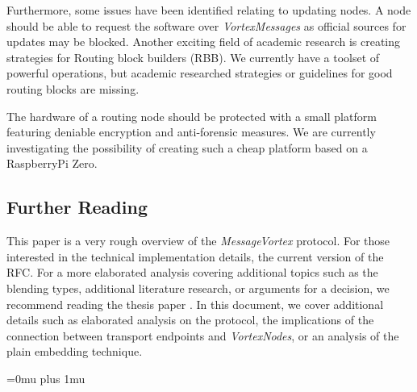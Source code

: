 \documentclass[acmsmall, screen, review]{acmart}
\begin{document}
Furthermore, some issues have been identified relating to updating nodes. A node should be able to request the software over \emph{VortexMessages} as official sources for updates may be blocked. Another exciting field of academic research is creating strategies for Routing block builders (RBB). We currently have a toolset of powerful operations, but academic researched strategies or guidelines for good routing blocks are missing. 

The hardware of a routing node should be protected with a small platform featuring deniable encryption and anti-forensic measures. We are currently investigating the possibility of creating such a cheap platform based on a RaspberryPi Zero. 

\subsection{Further Reading}
This paper is a very rough overview of the \emph{MessageVortex} protocol. For those interested in the technical implementation details, the current version of the RFC\cite{MessageVortexRFC}. For a more elaborated analysis covering additional topics such as the blending types, additional literature research, or arguments for a decision, we recommend reading the thesis paper \cite{messageVortex}. In this document, we cover additional details such as elaborated analysis on the protocol, the implications of the connection between transport endpoints and \emph{VortexNodes}, or an analysis of the plain embedding technique.



\Urlmuskip=0mu plus 1mu %

\end{document}
